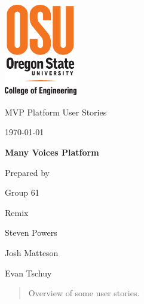 \documentclass[onecolumn, draftclsnofoot,10pt, compsoc]{IEEEtran}
\def \CapstoneTeamName{		Remix}
\def \CapstoneTeamNumber{		61}
\def \GroupMemberOne{			Steven Powers}
\def \GroupMemberTwo{			Josh Matteson}
\def \GroupMemberThree{			Evan Tschuy}
\def \CapstoneProjectName{		Many Voices Platform}
\def \CapstoneSponsorCompany{	Oregon State University}
\def \CapstoneSponsorPerson{		Carlos Jensen}
\def \DocType{
	User Stories
}
\newcommand{\NameSigPair}[1]{\par
\makebox[2.75in][r]{#1} \hfil 	\makebox[3.25in]{\makebox[2.25in]{\hrulefill} \hfill		\makebox[.75in]{\hrulefill}}
\par\vspace{-12pt} \textit{\tiny\noindent
\makebox[2.75in]{} \hfil		\makebox[3.25in]{\makebox[2.25in][r]{Signature} \hfill	\makebox[.75in][r]{Date}}}}
\renewcommand{\NameSigPair}[1]{#1}
\begin{document}
\begin{titlepage}
    \begin{singlespace}
    	\includegraphics[height=4cm]{coe_v_spot1}
        \hfill
        \par\vspace{.2in}
        \centering
        \scshape{
            \huge MVP Platform \DocType \par
            {\large\today}\par
            \vspace{.5in}
            \textbf{\Huge\CapstoneProjectName}\par
            \vfill
            {\large Prepared by }\par
            Group\CapstoneTeamNumber\par
            \CapstoneTeamName\par
            \vspace{5pt}
            {\Large
                \NameSigPair{\GroupMemberOne}\par
                \NameSigPair{\GroupMemberTwo}\par
                \NameSigPair{\GroupMemberThree}\par
            }
            \vspace{20pt}
        }
        \begin{abstract}
        	Overview of some user stories.
        \end{abstract}
    \end{singlespace}
\end{titlepage}
\newpage
{}
\clearpage
\end{document}
